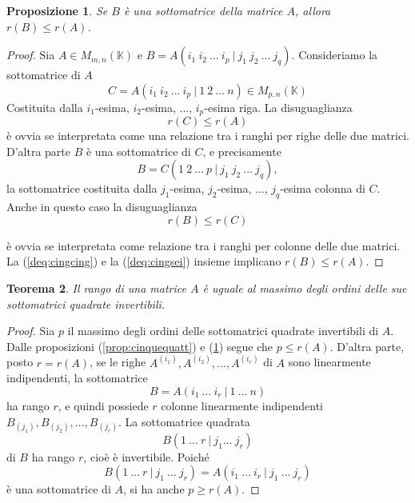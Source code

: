 \documentclass{article}
\theoremstyle{plain}
\newtheorem{thm}{Teorema}[section]
\newtheorem{prop}[thm]{Proposizione}
\theoremstyle{definition}
\theoremstyle{remark}
\begin{document}
\begin{bxthm}
\begin{prop}\label{prop:cinquecinq}
    Se $B$ è una sottomatrice della matrice $A$, allora $r(B)\leq r(A)$.
\end{prop}
\end{bxthm}
\begin{proof}
    Sia $A\in M_{m,n}(\mathbb{K})$ e $B = A(i_1 \ i_2 \ ... \ i_p \ |\  j_1\  j_2 \ ... \ j_q)$. 
    Consideriamo la sottomatrice di $A$
    \[C=A(i_{1}\ i_{2}\ ...\ i_{p}\ |\ 1\ 2\ ...\ n)\in M_{p,n}(\mathbb{K})\]
    Costituita dalla $i_1$-esima, $i_2$-esima, ..., $i_p$-esima riga. 
    La disuguaglianza
    \begin{equation}\label{deq:cingcing}
    r(C)\leq r(A)
    \end{equation}
    è ovvia se interpretata come una relazione tra i ranghi per righe delle due matrici.
    D'altra parte $B$ è una sottomatrice di $C$, e precisamente    
    \[
        B=C(1 \ 2 \ \ldots \ p \ | \ j_1 \ j_2 \ \ldots \ j_q),
    \]
    la sottomatrice costituita dalla $j_1$-esima, $j_2$-esima, ..., $j_q$-esima colonna di $C$.
    Anche in questo caso la disuguaglianza
    \begin{equation}\label{deq:cingsei}
        r(B) \leq r(C)
    \end{equation}
    
    è ovvia se interpretata come relazione tra i ranghi per colonne delle due matrici.
    La (\ref{deq:cingcing}) e la (\ref{deq:cingsei}) insieme implicano $r(B) \leq r(A)$.
\end{proof}

\vspace{10pt}

\begin{bxthm}
\begin{thm}\label{thm:cinquesei}
    Il rango di una matrice $A$ è uguale al massimo degli ordini delle sue sottomatrici quadrate invertibili.
\end{thm}
\end{bxthm}
\begin{proof}
    Sia $p$ il massimo degli ordini delle sottomatrici quadrate invertibili di $A$. 
    Dalle proposizioni (\ref{prop:cinquequatt}) e (\ref{prop:cinquecinq}) segue che $p\leq r(A)$. 
    D'altra parte, posto $r = r(A)$, se le righe $A^{(i_1)}, A^{(i_2)}, ..., A^{(i_r)}$ di $A$ sono linearmente indipendenti, 
    la sottomatrice \[B = A(i_1 \ \ldots \ i_r \ | \ 1 \ \ldots \ n)\] ha rango $r$, e quindi possiede $r$ colonne linearmente 
    indipendenti $B_{(j_1)}, B_{(j_2)}, \ldots, B_{(j_r)}$. 
    La sottomatrice quadrata \[B(1 \ \ldots \ r \ | \ j_1 \ldots \ j_r)\] di $B$
    ha rango $r$, cioè è invertibile. Poiché
    \[
        B(1 \ \ldots \ r \ | \ j_1 \ \ldots \ j_r) = A(i_1 \ \ldots\  i_r \ | \ j_1 \ \ldots \ j_r)
    \]
    è una sottomatrice di $A$, si ha anche $p\geq r(A)$.
\end{proof}
\end{document}

